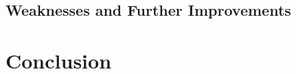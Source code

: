 \documentclass{mcmthesis}
\begin{document}
\subsection{Weaknesses and Further Improvements}
\section{Conclusion}

\newpage

\renewcommand{\refname}{References} %
\patchcmd{\thebibliography}{\section*}{\section*}{}{} %
\nocite{*}


\begin{appendices}  %

\end{appendices}  %
\end{document}

